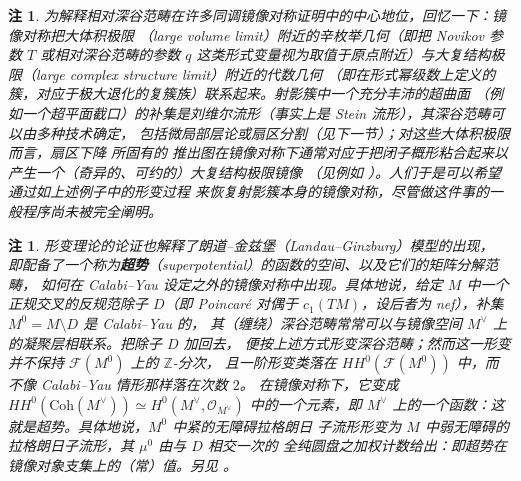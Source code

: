 \documentclass[UTF8,a4paper,11pt,fontset=windows]{ctexart}
\theoremstyle{cnthm}
\newtheorem{rem}[thm]{注}
\numberwithin{equation}{section}
\newcommand{\Z}{\mathbb{Z}}
\newcommand{\HH}{HH}                  %
\newcommand{\FF}{\mathcal{F}}         %
\newcommand{\OH}{\mathcal{O}}         %
\begin{document}
\begin{rem}\label{rem:2.9}
为解释相对深谷范畴在许多同调镜像对称证明中的中心地位，回忆一下：镜像对称把大体积极限
（large volume limit）附近的辛枚举几何（即把 Novikov 参数 $T$ 或相对深谷范畴的参数 $q$
这类形式变量视为取值于原点附近）与大复结构极限（large complex structure limit）附近的代数几何
（即在形式幂级数上定义的簇，对应于极大退化的复簇族）联系起来。射影簇中一个充分丰沛的超曲面
（例如一个超平面截口）的补集是刘维尔流形（事实上是 Stein 流形），其深谷范畴可以由多种技术确定，
包括微局部层论或扇区分割（见下一节）；对这些大体积极限而言，扇区下降 \cite{r57} 所固有的
推出图在镜像对称下通常对应于把闭子概形粘合起来以产生一个（奇异的、可约的）大复结构极限镜像
（见例如 \cite{r50,r51}）。人们于是可以希望通过如上述例子中的形变过程 \cite{r94,r95,r55}
来恢复射影簇本身的镜像对称，尽管做这件事的一般程序尚未被完全阐明。
\end{rem}

\begin{rem}\label{rem:2.10}
形变理论的论证也解释了朗道--金兹堡（Landau--Ginzburg）模型的出现，
即配备了一个称为\textbf{超势}（superpotential）的函数的空间、以及它们的矩阵分解范畴，
如何在 Calabi--Yau 设定之外的镜像对称中出现。具体地说，给定 $M$ 中一个正规交叉的反规范除子
$D$（即 Poincaré 对偶于 $c_1(TM)$，设后者为 nef），补集 $M^{0}=M\setminus D$ 是 Calabi--Yau 的，
其（缠绕）深谷范畴常常可以与镜像空间 $M^{\vee}$ 上的凝聚层相联系。把除子 $D$ 加回去，
便按上述方式形变深谷范畴；然而这一形变并不保持 $\FF(M^{0})$ 上的 $\Z$-分次，
且一阶形变类落在 $\HH^{0}(\FF(M^{0}))$ 中，而不像 Calabi--Yau 情形那样落在次数 $2$。
在镜像对称下，它变成 $\HH^{0}(\mathrm{Coh}(M^{\vee}))\simeq H^{0}(M^{\vee},\OH_{M^{\vee}})$
中的一个元素，即 $M^{\vee}$ 上的一个函数：这就是超势。具体地说，$M^{0}$ 中紧的无障碍拉格朗日
子流形形变为 $M$ 中弱无障碍的拉格朗日子流形，其 $\mu^{0}$ 由与 $D$ 相交一次的
全纯圆盘之加权计数给出：即超势在镜像对象支集上的（常）值。另见 \cite{r19}。
\end{rem}

\end{document}
